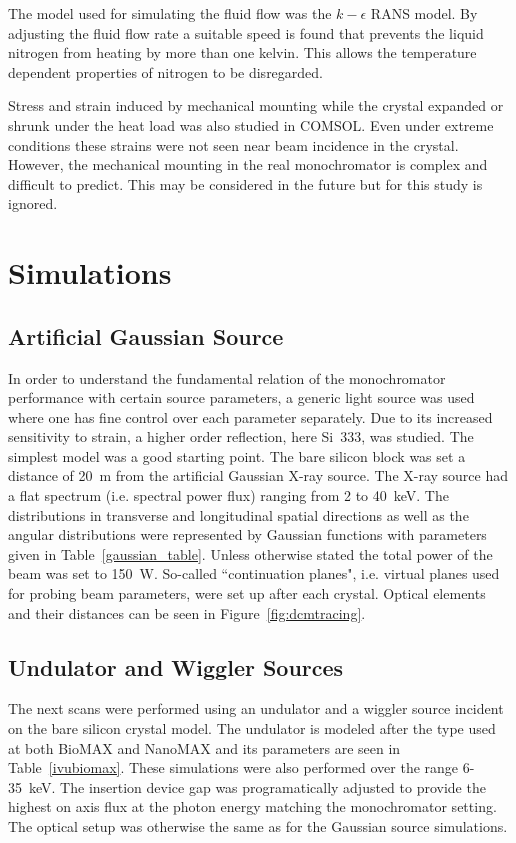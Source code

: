 \documentclass[preprint]{iucr}              %
\begin{document}
The model used for simulating the fluid flow was the $k-\epsilon$ RANS model. By adjusting the fluid flow rate a suitable speed is found that prevents the liquid nitrogen from heating by more than one kelvin. This allows the temperature dependent properties of nitrogen to be disregarded.

Stress and strain induced by mechanical mounting while the crystal expanded or shrunk under the heat load was also studied in COMSOL. Even under extreme conditions these strains were not seen near beam incidence in the crystal. However, the mechanical mounting in the real monochromator is complex and difficult to predict. This may be considered in the future but for this study is ignored.
\section{Simulations}

\subsection{Artificial Gaussian Source}
In order to understand the fundamental relation of the monochromator performance with certain source parameters, a generic light source was used where one has fine control over each parameter separately. Due to its increased sensitivity to strain, a higher order reflection, here Si~333, was studied. The simplest model was a good starting point. The bare silicon block was set a distance of 20~m from the artificial Gaussian X-ray source. The X-ray source had a flat spectrum (i.e. spectral power flux) ranging from 2 to 40~keV. The distributions in transverse and longitudinal spatial directions as well as the angular distributions were represented by Gaussian functions with parameters given in Table~\ref{gaussian_table}. Unless otherwise stated the total power of the beam was set to 150~W. So-called ``continuation planes", i.e. virtual planes used for probing beam parameters, were set up after each crystal. Optical elements and their distances can be seen in Figure~\ref{fig:dcmtracing}.

\subsection{Undulator and Wiggler Sources}\label{undulatorsource}
The next scans were performed using an undulator and a wiggler source incident on the bare silicon crystal model. The undulator is modeled after the type used at both BioMAX and NanoMAX and its parameters are seen in Table~\ref{ivubiomax}. These simulations were also performed over the range 6-35~keV. The insertion device gap was programatically adjusted to provide the highest on axis flux at the photon energy matching the monochromator setting. The optical setup was otherwise the same as for the Gaussian source simulations.
\end{document}
